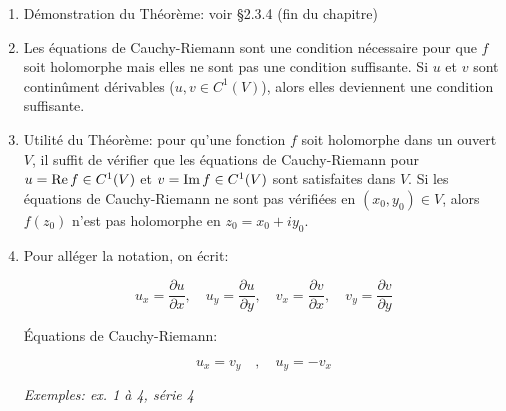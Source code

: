 \begin{remark}\hfill
\begin{enumerate}[label=\arabic{enumi})]
    \item 
    Démonstration du Théorème: voir §2.3.4 (fin du chapitre)
    \item 
    Les équations de Cauchy-Riemann sont une condition nécessaire pour que $f$ soit holomorphe mais elles ne sont pas une condition suffisante.
    Si $u$ et $v$ sont continûment dérivables ($u,v \in C^1(V)$), alors elles deviennent une condition suffisante.
    \item 
    Utilité du Théorème: pour qu'une fonction $f$ soit holomorphe dans un ouvert $V$, il suffit de vérifier que les équations de Cauchy-Riemann pour $u = \operatorname{Re} f \in C^1(V)$ et $v = \operatorname{Im} f \in C^1(V)$ sont satisfaites dans $V$.
    Si les équations de Cauchy-Riemann ne sont pas vérifiées en $(x_0,y_0) \in V$, alors $f(z_0)$ n'est pas holomorphe en $z_0 = x_0 + iy_0$.
    \item 
    Pour alléger la notation, on écrit:
    
    \[
    u_x = \frac{\partial u}{\partial x}, \quad
    u_y = \frac{\partial u}{\partial y}, \quad
    v_x = \frac{\partial v}{\partial x}, \quad
    v_y = \frac{\partial v}{\partial y}
    \]
    
    Équations de Cauchy-Riemann:
    
    \[
    u_x = v_y \quad, \quad u_y = -v_x
    \]
    
    \textit{Exemples: ex. 1 à 4, série 4}
\end{enumerate}
\end{remark}




















